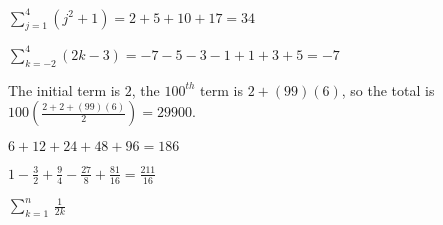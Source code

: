 \begin{Solution}{13.7}
$\sum_{j=1}^{4} (j^2+1) = 2+5+10+17 = 34$
\end{Solution}

\begin{Solution}{13.8}
$\sum_{k=-2}^{4} (2k-3) = -7 -5 -3 -1+1+3+5 = -7$ 
\end{Solution}

\begin{Solution}{13.9}
The initial term is $2$, the $100^{th}$ term is $2 +(99)(6)$, so the total is $100\left(\frac{2 + 2+(99)(6)}{2}\right)
= 29900$.
\end{Solution}

\begin{Solution}{13.10}
$6 + 12 + 24 + 48 + 96 = 186$
\end{Solution}

\begin{Solution}{13.11}
$1 - \frac{3}{2} +\frac{9}{4} - \frac{27}{8} + \frac{81}{16} = \frac{211}{16}$
\end{Solution}

\begin{Solution}{13.12}
$\displaystyle \sum_{k =1}^n\, \frac{1}{2k}$
\end{Solution}
